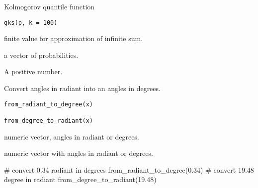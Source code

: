 \documentclass[a4paper]{book}
\begin{document}
%
\begin{Description}\relax
Kolmogorov quantile function
\end{Description}
%
\begin{Usage}
\begin{verbatim}
qks(p, k = 100)
\end{verbatim}
\end{Usage}
%
\begin{Arguments}
\begin{ldescription}
\item[\code{k}] finite value for approximation of infinite sum.

\item[\code{x}] a vector of probabilities.
\end{ldescription}
\end{Arguments}
%
\begin{Value}
A positive number.
\end{Value}
%
\begin{Description}\relax
Convert angles in radiant into an angles in degrees.
\end{Description}
%
\begin{Usage}
\begin{verbatim}
from_radiant_to_degree(x)

from_degree_to_radiant(x)
\end{verbatim}
\end{Usage}
%
\begin{Arguments}
\begin{ldescription}
\item[\code{x}] numeric vector, angles in radiant or degrees.
\end{ldescription}
\end{Arguments}
%
\begin{Value}
numeric vector with angles in radiant or degrees.
\end{Value}
%
\begin{Examples}
\begin{ExampleCode}
# convert 0.34 radiant in degrees
from_radiant_to_degree(0.34)
# convert 19.48 degree in radiant
from_degree_to_radiant(19.48)

\end{ExampleCode}
\end{Examples}
\end{document}
